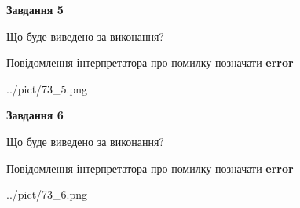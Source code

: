 \documentclass[12pt, ukrainian]{article}
\begin{document}
{{\begin {center}\textbf{Завдання 5}\end {center}}\par
Що буде виведено за виконання? \par
Повідомлення інтерпретатора про помилку позначати \textbf{error}

\begin{center}
	{../pict/73_5.png}
\end{center}
\newpage

{\begin {center}\textbf{Завдання 6}\end {center}}\par
Що буде виведено за виконання? \par
Повідомлення інтерпретатора про помилку позначати \textbf{error}

\begin{center}
	{../pict/73_6.png}
\end{center}
\newpage

}
\end{document}
